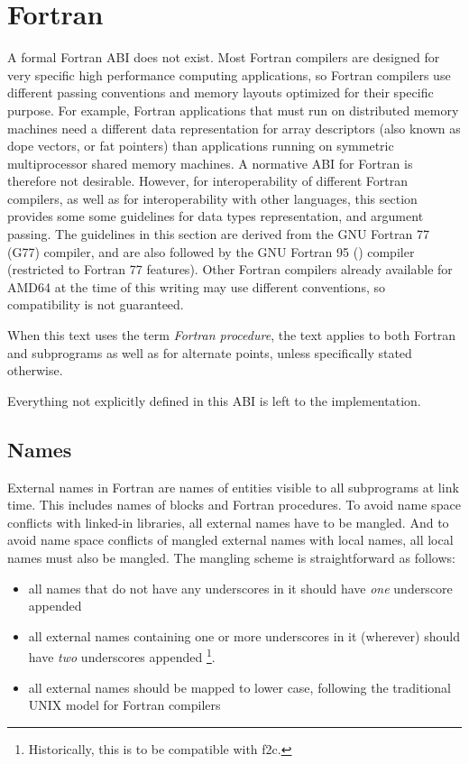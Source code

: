 \section{Fortran}
\label{section-fortran}

A formal Fortran ABI does not exist.  Most Fortran compilers are
designed for very specific high performance computing applications, so
Fortran compilers use different passing conventions and memory layouts
optimized for their specific purpose.  For example, Fortran
applications that must run on distributed memory machines need a
different data representation for array descriptors (also known as
dope vectors, or fat pointers) than applications running on symmetric
multiprocessor shared memory machines.  A normative ABI for Fortran is
therefore not desirable.  However, for interoperability of different
Fortran compilers, as well as for interoperability with other
languages, this section provides some some guidelines for data types
representation, and argument passing.  The guidelines in this section
are derived from the GNU Fortran 77 (G77) compiler, and are also
followed by the GNU Fortran 95 () compiler (restricted to
Fortran 77 features).  Other Fortran
compilers already available for AMD64 at the time of this writing may
use different conventions, so compatibility is not guaranteed.

When this text uses the term {\em Fortran procedure}, the text applies
to both Fortran  and  subprograms as
well as for alternate  points,
unless specifically stated otherwise.

Everything not explicitly defined in this ABI is left to the implementation.

\subsection{Names}
\label{sub_fortran_names}

External names in Fortran are names of entities visible to all
subprograms at link time.  This includes names of  blocks
and Fortran procedures.
To avoid name space conflicts with linked-in libraries, all external
names have to be mangled.  And to avoid name space conflicts
of mangled external names with local names, all local names must also
be mangled.
The mangling scheme is straightforward as follows:
\begin{itemize}
\item all names that do not have any underscores in it should have
{\em one} underscore appended
\item all external names containing one or
   more underscores in it (wherever) should have {\em two} underscores
   appended \footnote{Historically, this is to be compatible with f2c.}.
\item all external names should be mapped to lower case,
   following the traditional UNIX model for Fortran compilers
\end{itemize}

